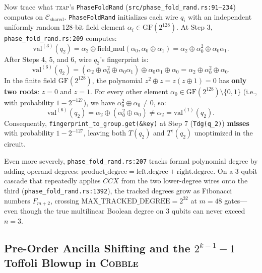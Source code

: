 \documentclass[11pt,a4paper]{article}
\theoremstyle{definition}
\begin{document}
Now trace what \textsc{tzap}'s \texttt{PhaseFoldRand} (\texttt{src/phase\_fold\_rand.rs:91--234}) computes on $\mathcal{C}_{\mathrm{shared}}$. \texttt{PhaseFoldRand} initializes each wire $q_i$ with an independent uniformly random 128-bit field element $\alpha_i \in \mathrm{GF}(2^{128})$. At Step 3, \texttt{phase\_fold\_rand.rs:209} computes:
\[
  \mathrm{val}^{(3)}(q_2) = \alpha_2 \oplus \mathrm{field\_mul}(\alpha_0, \alpha_0 \oplus \alpha_1) = \alpha_2 \oplus \alpha_0^2 \oplus \alpha_0\alpha_1.
\]
After Steps 4, 5, and 6, wire $q_2$'s fingerprint is:
\[
  \mathrm{val}^{(6)}(q_2) = (\alpha_2 \oplus \alpha_0^2 \oplus \alpha_0\alpha_1) \oplus \alpha_0\alpha_1 \oplus \alpha_0 = \alpha_2 \oplus \alpha_0^2 \oplus \alpha_0.
\]
In the finite field $\mathrm{GF}(2^{128})$, the polynomial $z^2 \oplus z = z(z \oplus 1) = 0$ has \textbf{only two roots}: $z = 0$ and $z = 1$. For every other element $\alpha_0 \in \mathrm{GF}(2^{128}) \setminus \{0,1\}$ (i.e., with probability $1 - 2^{-127}$), we have $\alpha_0^2 \oplus \alpha_0 \neq 0$, so:
\[
  \mathrm{val}^{(6)}(q_2) = \alpha_2 \oplus (\alpha_0^2 \oplus \alpha_0) \neq \alpha_2 = \mathrm{val}^{(1)}(q_2).
\]
Consequently, \texttt{fingerprint\_to\_group.get(\&key)} at Step 7 (\texttt{Tdg(q\_2)}) \textbf{misses} with probability $1 - 2^{-127}$, leaving both $T(q_2)$ and $T^\dagger(q_2)$ unoptimized in the circuit.

Even more severely, \texttt{phase\_fold\_rand.rs:207} tracks formal polynomial degree by adding operand degrees: $\mathrm{product\_degree} = \mathrm{left.degree} + \mathrm{right.degree}$. On a 3-qubit cascade that repeatedly applies $\mathit{CCX}$ from the two lower-degree wires onto the third (\texttt{phase\_fold\_rand.rs:1392}), the tracked degrees grow as Fibonacci numbers $F_{m+2}$, crossing $\mathrm{MAX\_TRACKED\_DEGREE} = 2^{32}$ at $m = 48$ gates---even though the true multilinear Boolean degree on 3 qubits can never exceed $n = 3$.

\subsection{Pre-Order Ancilla Shifting and the $2^{k-1}-1$ Toffoli Blowup in \textsc{Cobble}}
\label{sec:ancilla-shift}
\end{document}
